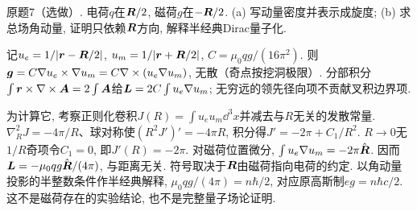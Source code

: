\begin{exercise}
原题7（选做）. 电荷$q$在$\boldsymbol{R}/2$, 磁荷$g$在$-\boldsymbol{R}/2$. (a) 写动量密度并表示成旋度; (b) 求总场角动量, 证明只依赖$\boldsymbol{R}$方向, 解释半经典Dirac量子化.
\end{exercise}
\begin{solution}
记$u_e=1/|\boldsymbol{r}-\boldsymbol{R}/2|$, $u_m=1/|\boldsymbol{r}+\boldsymbol{R}/2|$, $C=\mu_0qg/(16\pi^2)$. 则$\boldsymbol{g}=C\nabla u_e\times\nabla u_m=C\nabla\times(u_e\nabla u_m)$, 无散（奇点按挖洞极限）. 分部积分$\int\boldsymbol{r}\times\nabla\times\boldsymbol{A}=2\int\boldsymbol{A}$给$\boldsymbol{L}=2C\int u_e\nabla u_m$; 无穷远的领先径向项不贡献叉积边界项.

为计算它, 考察正则化卷积$J(R)=\int u_eu_m\dd^3x$并减去与$R$无关的发散常量. $\nabla_R^2J=-4\pi/R$、球对称使$(R^2J')'=-4\pi R$, 积分得$J'=-2\pi+C_1/R^2$. $R\to0$无$1/R$奇项令$C_1=0$, 即$J'(R)=-2\pi$. 对磁荷位置微分, $\int u_e\nabla u_m=-2\pi\hat{\boldsymbol{R}}$. 因而$\boldsymbol{L}=-\mu_0qg\hat{\boldsymbol{R}}/(4\pi)$, 与距离无关. 符号取决于$\boldsymbol{R}$由磁荷指向电荷的约定. 以角动量投影的半整数条件作半经典解释, $\mu_0qg/(4\pi)=n\hbar/2$, 对应原高斯制$eg=n\hbar c/2$. 这不是磁荷存在的实验结论, 也不是完整量子场论证明.
\end{solution}
